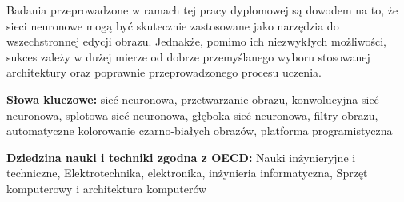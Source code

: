  Badania przeprowadzone w ramach tej pracy dyplomowej są dowodem na to, że
  sieci neuronowe mogą być skutecznie zastosowane jako narzędzia do wszechstronnej
  edycji obrazu. Jednakże, pomimo ich niezwykłych możliwości, sukces
  zależy w dużej mierze od dobrze przemyślanego
  wyboru stosowanej architektury oraz poprawnie przeprowadzonego
  procesu uczenia.

  \bigskip

  \noindent\textbf{Słowa kluczowe:} sieć neuronowa, przetwarzanie obrazu,
  konwolucyjna sieć neuronowa, splotowa sieć neuronowa,
  głęboka sieć neuronowa, filtry obrazu, automatyczne kolorowanie czarno-białych
  obrazów, platforma programistyczna

  \bigskip

  \noindent\textbf{Dziedzina nauki i techniki zgodna z OECD:} Nauki
  inżynieryjne i techniczne, Elektrotechnika, elektronika, inżynieria
  informatyczna, Sprzęt komputerowy i architektura komputerów
